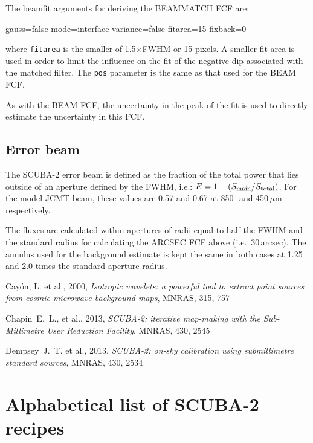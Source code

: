 \documentclass[twoside,11pt,nolof]{starlink}
\providecommand{\task}[1]{\textsf{#1}}
\begin{document}
The \task{beamfit} arguments for deriving the BEAMMATCH FCF are:
\begin{terminalv}
gauss=false mode=interface variance=false fitarea=15 fixback=0
\end{terminalv}
where \verb+fitarea+ is the smaller of 1.5$\times$FWHM or 15 pixels. A
smaller fit area is used in order to limit the influence on the fit of
the negative dip associated with the matched filter. The \verb+pos+
parameter is the same as that used for the BEAM FCF.

As with the BEAM FCF, the uncertainty in the peak of the fit is used
to directly estimate the uncertainty in this FCF.

\subsection{Error beam}

The SCUBA-2 error beam is defined as the fraction of the total power
that lies outside of an aperture defined by the FWHM, i.e.: $E = 1 -
(S_{\rm main}/S_{\rm total})$. For the model JCMT beam, these values
are 0.57 and 0.67 at 850- and 450\,$\mu$m respectively.

The fluxes are calculated within apertures of radii equal to half the
FWHM and the standard radius for calculating the ARCSEC FCF above
(i.e.\ 30\,arcsec). The annulus used for the background estimate is
kept the same in both cases at 1.25 and 2.0 times the standard
aperture radius.



\begin{thebibliography}{}
 Cay{\'o}n, L. et al., 2000, \textit{Isotropic
    wavelets: a powerful tool to extract point sources from cosmic
    microwave background maps}, MNRAS, 315, 757

Chapin~E.~L., et al., 2013, \textit{SCUBA-2: iterative map-making with
  the Sub-Millimetre User Reduction Facility}, MNRAS, 430, 2545

Dempsey~J.~T. et al., 2013, \textit{SCUBA-2: on-sky calibration using
  submillimetre standard sources}, MNRAS, 430, 2534
\end{thebibliography}

\newpage
\appendix
\section{Alphabetical list of SCUBA-2 recipes\label{ap:list}}
\end{document}
